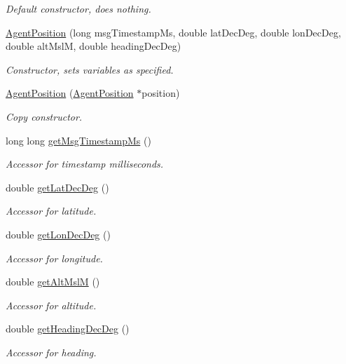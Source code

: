 \begin{DoxyCompactItemize}
\begin{DoxyCompactList}\small\item\em Default constructor, does nothing. \end{DoxyCompactList}\item 
\hyperlink{class_agent_position_a12f6eddef3a762e004144330df957ea8}{AgentPosition} (long msgTimestampMs, double latDecDeg, double lonDecDeg, double altMslM, double headingDecDeg)
\begin{DoxyCompactList}\small\item\em Constructor, sets variables as specified. \end{DoxyCompactList}\item 
\hyperlink{class_agent_position_a77d44af3e39f6e1db2f5cc4f7bd810a6}{AgentPosition} (\hyperlink{class_agent_position}{AgentPosition} $\ast$position)
\begin{DoxyCompactList}\small\item\em Copy constructor. \end{DoxyCompactList}\item 
long long \hyperlink{class_agent_position_a25d0e39d8f89352435db6ecf62374e42}{getMsgTimestampMs} ()
\begin{DoxyCompactList}\small\item\em Accessor for timestamp milliseconds. \end{DoxyCompactList}\item 
double \hyperlink{class_agent_position_a742ef33e3cbc77086f3f9f69bfb5b97e}{getLatDecDeg} ()
\begin{DoxyCompactList}\small\item\em Accessor for latitude. \end{DoxyCompactList}\item 
double \hyperlink{class_agent_position_acd42df2a0ae2377614ca99f1365b355e}{getLonDecDeg} ()
\begin{DoxyCompactList}\small\item\em Accessor for longitude. \end{DoxyCompactList}\item 
double \hyperlink{class_agent_position_ae36081c9c143a067d7a48ae087d8802a}{getAltMslM} ()
\begin{DoxyCompactList}\small\item\em Accessor for altitude. \end{DoxyCompactList}\item 
double \hyperlink{class_agent_position_afce1996922af5675900bde64ef0324f2}{getHeadingDecDeg} ()
\begin{DoxyCompactList}\small\item\em Accessor for heading. \end{DoxyCompactList}\item 

\end{DoxyCompactItemize}
